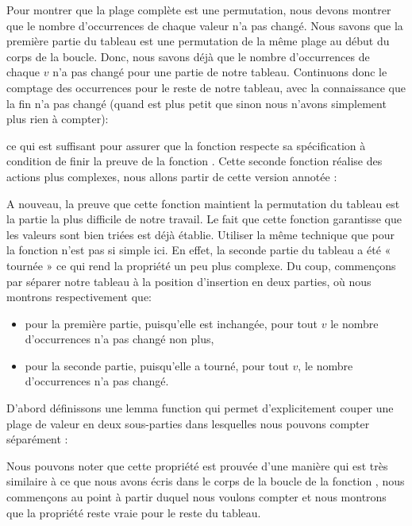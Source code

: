 Pour montrer que la plage complète est une permutation, nous devons montrer que le
nombre d'occurrences de chaque valeur n'a pas changé. Nous savons que la première
partie du tableau est une permutation de la même plage au début du corps de la
boucle. Donc, nous savons déjà que le nombre d'occurrences de chaque $v$ n'a pas
changé pour une partie de notre tableau. Continuons donc le comptage des
occurrences pour le reste de notre tableau, avec la connaissance que la fin n'a
pas changé (quand  est plus petit que  sinon
nous n'avons simplement plus rien à compter):




ce qui est suffisant pour assurer que la fonction 
respecte sa spécification à condition de finir la preuve de la fonction
. Cette seconde fonction réalise des actions plus
complexes, nous allons partir de cette version annotée :




A nouveau, la preuve que cette fonction maintient la permutation du tableau est
la partie la plus difficile de notre travail. Le fait que cette fonction
garantisse que les valeurs sont bien triées est déjà établie. Utiliser la
même technique que pour la fonction  n'est pas si
simple ici. En effet, la seconde partie du tableau a été « tournée » ce qui 
rend la propriété un peu plus complexe. Du coup, commençons par séparer notre
tableau à la position d'insertion en deux parties, où nous montrons
respectivement que:


\begin{itemize}
    \item pour la première partie, puisqu'elle est inchangée, pour tout $v$
          le nombre d'occurrences n'a pas changé non plus,
    \item pour la seconde partie, puisqu'elle a tourné, pour tout $v$, le
          nombre d'occurrences n'a pas changé.
\end{itemize}


D'abord définissons une lemma function qui permet d'explicitement couper une
plage de valeur en deux sous-parties dans lesquelles nous pouvons compter
séparément :




Nous pouvons noter que cette propriété est prouvée d'une manière qui est très
similaire à ce que nous avons écris dans le corps de la boucle de la fonction
, nous commençons au point à partir duquel nous
voulons compter et nous montrons que la propriété reste vraie pour le reste
du tableau.


